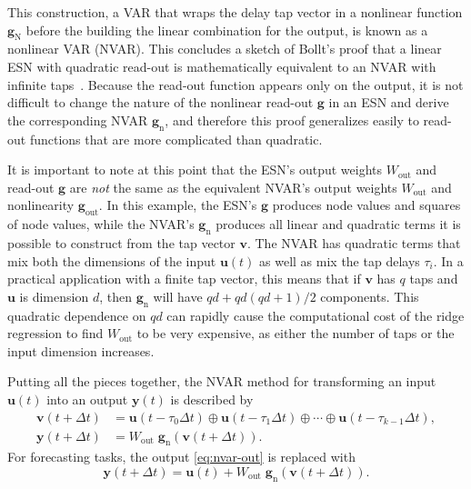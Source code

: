 This construction, a VAR that wraps the delay tap vector in a
nonlinear function $\bm{g}_\text{N}$ before the building the linear
combination for the output, is known as a nonlinear VAR (NVAR). This
concludes a sketch of Bollt's proof that a linear ESN with quadratic
read-out is mathematically equivalent to an NVAR with infinite
taps~\cite{bollt2021}. Because the read-out function appears only on
the output, it is not difficult to change the nature of the nonlinear
read-out $\bm{g}$ in an ESN and derive the corresponding NVAR $\bm{g}_\text{n}$,
and therefore this proof generalizes easily to read-out functions that are more
complicated than quadratic.

It is important to note at this point that the ESN's output weights
$W_\text{out}$ and read-out $\bm{g}$ are \emph{not} the same as the
equivalent NVAR's output weights $W_\text{out}$ and nonlinearity
$\bm{g}_\text{out}$. In this example, the ESN's $\bm{g}$ produces node values and squares of node
values, while the NVAR's $\bm{g}_\text{n}$ produces all linear and
quadratic terms it is possible to construct from the tap vector
$\bm{v}$. The NVAR has quadratic terms that mix both the dimensions of the input $\bm{u}(t)$ as well as mix the tap delays $\tau_i$. In a practical application with a finite tap vector, this
means that if $\bm{v}$ has $q$ taps and $\bm{u}$ is dimension $d$, then $\bm{g}_\text{n}$ will have
$qd + qd(qd+1)/2$ components. This quadratic dependence on $qd$ can
rapidly cause the computational cost of the ridge regression to find $W_\text{out}$ to be very
expensive, as either the number of taps or the input dimension increases.

Putting all the pieces together, the NVAR method for transforming an
input $\bm{u}(t)$ into an output $\bm{y}(t)$ is described by
\begin{align}
  \label{eq:nvar}
  \bm{v}(t + \Delta t) &= \bm{u}(t - \tau_0 \Delta t) \oplus \bm{u}(t - \tau_1 \Delta t) \oplus \cdots \oplus \bm{u}(t - \tau_{k-1} \Delta t), \\
  \label{eq:nvar-out}
  \bm{y}(t + \Delta t) &= W_\text{out}\;\bm{g}_\text{n}\left(\bm{v}(t + \Delta t)\right).
\end{align}
For forecasting tasks, the output \cref{eq:nvar-out} is replaced with
\begin{equation}
  \label{eq:nvar-out-forecast}
  \bm{y}(t + \Delta t) = \bm{u}(t) + W_\text{out}\;\bm{g}_\text{n}\left(\bm{v}(t + \Delta t)\right).
\end{equation}

